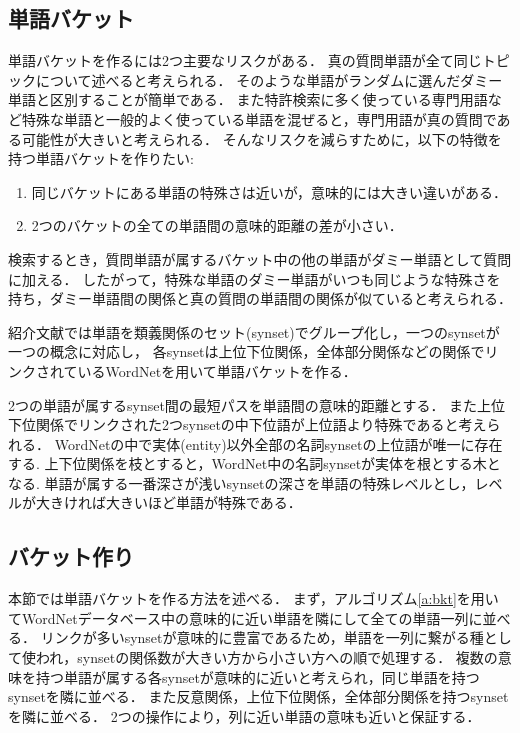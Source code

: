 \documentclass[master]{suribt}
\theoremstyle{definition}
\begin{document}
 \subsection{単語バケット}
 単語バケットを作るには2つ主要なリスクがある．
 真の質問単語が全て同じトピックについて述べると考えられる．
 そのような単語がランダムに選んだダミー単語と区別することが簡単である．
 また特許検索に多く使っている専門用語など特殊な単語と一般的よく使っている単語を混ぜると，専門用語が真の質問である可能性が大きいと考えられる．
 そんなリスクを減らすために，以下の特徴を持つ単語バケットを作りたい:
 \begin{enumerate}
 \renewcommand{\labelenumi}{(\roman{enumi})}
 \item 同じバケットにある単語の特殊さは近いが，意味的には大きい違いがある．
 \item 2つのバケットの全ての単語間の意味的距離の差が小さい．
 \end{enumerate}
 検索するとき，質問単語が属するバケット中の他の単語がダミー単語として質問に加える．
 したがって，特殊な単語のダミー単語がいつも同じような特殊さを持ち，ダミー単語間の関係と真の質問の単語間の関係が似ていると考えられる．

 紹介文献では単語を類義関係のセット(synset)でグループ化し，一つのsynsetが一つの概念に対応し，
 各synsetは上位下位関係，全体部分関係などの関係でリンクされているWordNet\cite{wordnet1995}を用いて単語バケットを作る．

 2つの単語が属するsynset間の最短パスを単語間の意味的距離とする．
 また上位下位関係でリンクされた2つsynsetの中下位語が上位語より特殊であると考えられる．
 WordNetの中で実体(entity)以外全部の名詞synsetの上位語が唯一に存在する.
 上下位関係を枝とすると，WordNet中の名詞synsetが実体を根とする木となる.
 単語が属する一番深さが浅いsynsetの深さを単語の特殊レベルとし，レベルが大きければ大きいほど単語が特殊である．

 \subsection{バケット作り}
 本節では単語バケットを作る方法を述べる．
 まず，アルゴリズム\ref{a:bkt}を用いてWordNetデータベース中の意味的に近い単語を隣にして全ての単語一列に並べる．
 リンクが多いsynsetが意味的に豊富であるため，単語を一列に繋がる種として使われ，synsetの関係数が大きい方から小さい方への順で処理する．
 複数の意味を持つ単語が属する各synsetが意味的に近いと考えられ，同じ単語を持つsynsetを隣に並べる．
 また反意関係，上位下位関係，全体部分関係を持つsynsetを隣に並べる．
 2つの操作により，列に近い単語の意味も近いと保証する．
\end{document}
